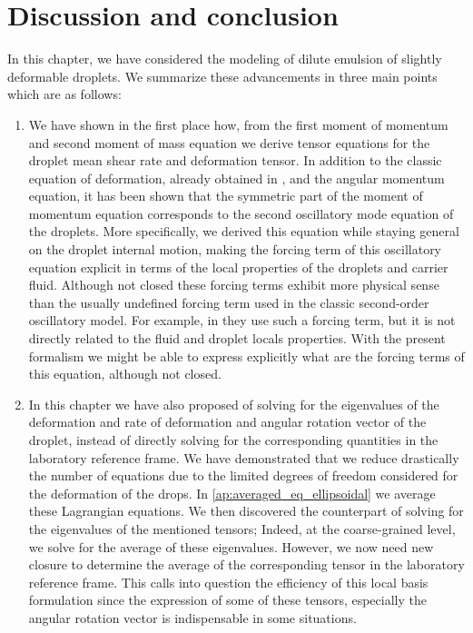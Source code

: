 \section{Discussion and conclusion}

In this chapter, we have considered the modeling of dilute emulsion of slightly deformable droplets. 
We summarize these advancements in three main points which are as follows: 
\begin{enumerate}
    \item We have shown in the first place how, from the first moment of momentum and second moment of mass equation we derive tensor equations for the droplet mean shear rate and deformation tensor. 
In addition to the classic equation of deformation, already obtained in \citet{goddard1967nonlinear},  and the angular momentum equation, it has been shown that the symmetric part of the moment of momentum equation corresponds to the second oscillatory mode equation of the droplets. 
More specifically, we derived this equation while staying general on the droplet internal motion, making the forcing term of this oscillatory equation explicit in terms of the local properties of the droplets and carrier fluid. 
Although not closed these forcing terms exhibit more physical sense than the usually undefined forcing term used in the classic second-order oscillatory model.
For example, in \citet{riviere2021sub} they use such a forcing term, but it is not directly related to the fluid and droplet locals properties.
With the present formalism we might be able to express explicitly what are the forcing terms of this equation, although not closed. 

\item 
In this chapter we have also proposed of solving for the eigenvalues of the deformation and rate of deformation and angular rotation vector of the droplet, instead of directly solving for the corresponding quantities in the laboratory reference frame. 
We have demonstrated that we reduce drastically the number of equations due to the limited degrees of freedom considered for the deformation of the drops. 
In \ref{ap:averaged_eq_ellipsoidal} we average these Lagrangian equations. 
We then discovered the counterpart of solving for the eigenvalues of the mentioned tensors; 
Indeed, at the coarse-grained level, we solve for the average of these eigenvalues. 
However, we now need new closure to determine the average of the corresponding tensor in the laboratory reference frame.  
This calls into question the efficiency of this local basis formulation since the expression of some of these tensors, especially the angular rotation vector is indispensable in some situations. 


\end{enumerate}
